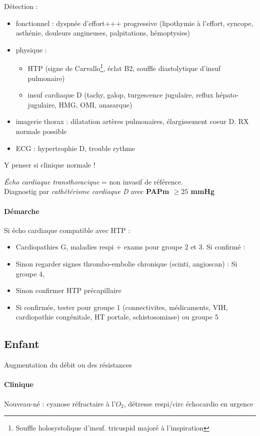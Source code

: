 Détection :
\begin{itemize}
\item fonctionnel : dyspnée d'effort+++ progressive (lipothymie à l'effort,
  syncope, asthénie, douleurs angineuses, palpitations, hémoptysies)
\item physique : 
  \begin{itemize}
  \item HTP (signe de Carvallo\footnote{Souffle holosystolique
    d'insuf. tricuspid majoré à l'inspiration}, éclat B2, souffle diastolytique
  d'insuf pulmonaire)
  \item insuf cardiaque D (tachy, galop, turgescence jugulaire, reflux
  hépato-jugulaire, HMG, OMI, anasarque)
  \end{itemize}
\item imagerie thorax : dilatation artères pulmonaires, élargissement coeur
  D. RX normale possible
\item ECG : hypertrophie D, trouble rythme
\end{itemize}
Y penser si clinique normale !

\textit{Écho cardiaque transthoracique} = non invasif de référence. \\
Diagnostig par \textit{cathétérisme cardiaque D} avec \textbf{PAPm $\ge 25$ mmHg}

\paragraph{Démarche}
Si écho cardiaque compatible avec HTP :
\begin{itemize}
\item Cardiopathies G, maladies respi + exams pour groupe 2 et 3. Si confirmé
  : \faHandStopO
\item Sinon regarder signes thrombo-embolie chronique (scinti, angioscan) : Si
  groupe 4, \faHandStopO
\item Sinon confirmer HTP précapillaire 
\item Si confirmée, tester pour groupe 1 (connectivites, médicaments, VIH,
  cardiopathie congénitale, HT portale, schistosomiase) ou groupe 5
\end{itemize}


\subsection{Enfant}

Augmentation du débit ou des résistances

\paragraph{Clinique}
Nouveau-né : cyanose réfractaire à l'\(O_2\), détresse respi/circ \thus échocardio en
urgence \danger

